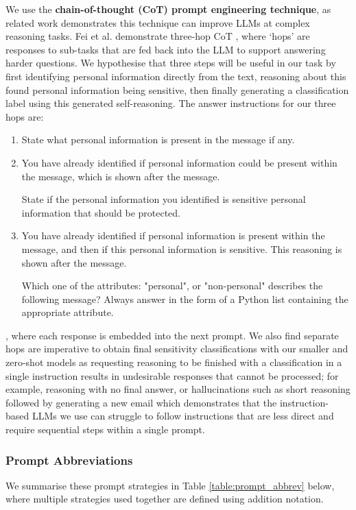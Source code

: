 We use the \textbf{chain-of-thought (CoT) prompt engineering technique}, as related work demonstrates this technique can improve LLMs at complex reasoning tasks. Fei et al. demonstrate three-hop CoT \cite{fei2023reasoning}, where `hops' are responses to sub-tasks that are fed back into the LLM to support answering harder questions. We hypothesise that three steps will be useful in our task by first identifying personal information directly from the text, reasoning about this found personal information being sensitive, then finally generating a classification label using this generated self-reasoning. The answer instructions for our three hops are:
\begin{enumerate}
    \item State what personal information is present in the message if any.
    \item You have already identified if personal information could be present within the message, which is shown after the message.
    
    State if the personal information you identified is sensitive personal information that should be protected.
    \item You have already identified if personal information is present within the message, and then if this personal information is sensitive. This reasoning is shown after the message.

    Which one of the attributes: "personal", or "non-personal" describes the following message?
    Always answer in the form of a Python list containing the appropriate attribute.
\end{enumerate}
, where each response is embedded into the next prompt. We also find separate hops are imperative to obtain final sensitivity classifications with our smaller and zero-shot models as requesting reasoning to be finished with a classification in a single instruction results in undesirable responses that cannot be processed; for example, reasoning with no final answer, or hallucinations such as short reasoning followed by generating a new email which demonstrates that the instruction-based LLMs we use can struggle to follow instructions that are less direct and require sequential steps within a single prompt.

\subsubsection{Prompt Abbreviations}
We summarise these prompt strategies in Table \ref{table:prompt_abbrev} below, where multiple strategies used together are defined using addition notation.

